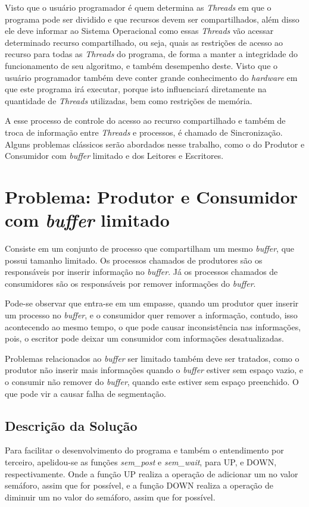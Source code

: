 \documentclass[a4paper, 11pt]{article}
\begin{document}
Visto que o usuário programador é quem determina as \textit{Threads} em que o programa pode ser dividido e que recursos devem ser compartilhados, além disso ele deve informar ao Sistema Operacional como essas \textit{Threads} vão acessar determinado recurso compartilhado, ou seja, quais as restrições de acesso ao recurso para todas as \textit{Threads} do programa, de forma a manter a integridade do funcionamento de seu algoritmo, e também desempenho deste. Visto que o usuário programador também deve conter grande conhecimento do \textit{hardware} em que este programa irá executar, porque isto influenciará diretamente na quantidade de \textit{Threads} utilizadas, bem como restrições de memória.

A esse processo de controle do acesso ao recurso compartilhado e também de troca de informação entre \textit{Threads} e processos, é chamado de Sincronização. Alguns problemas clássicos serão abordados nesse trabalho, como o do Produtor e Consumidor com \textit{buffer} limitado e dos Leitores e Escritores.

\section{Problema: Produtor e Consumidor com \textit{buffer} limitado}
Consiste em um conjunto de processo que compartilham um mesmo \textit{buffer}, que possui tamanho limitado. Os processos chamados de produtores são os responsáveis por inserir informação no \textit{buffer}. Já os processos chamados de consumidores são os responsáveis por remover informações do \textit{buffer}. 

Pode-se observar que entra-se em um empasse, quando um produtor quer inserir um processo no \textit{buffer}, e o consumidor quer remover a informação, contudo, isso acontecendo ao mesmo tempo, o que pode causar inconsistência nas informações, pois, o escritor pode deixar um consumidor com informações desatualizadas.

Problemas relacionados ao \textit{buffer} ser limitado também deve ser tratados, como o produtor não inserir mais informações quando o \textit{buffer} estiver sem espaço vazio, e o consumir não remover do \textit{buffer}, quando este estiver sem espaço preenchido. O que pode vir a causar falha de segmentação.

\subsection{Descrição da Solução}
Para facilitar o desenvolvimento do programa e também o entendimento por terceiro, apelidou-se as funções \textit{sem\_post} e \textit{sem\_wait}, para UP, e DOWN, respectivamente. Onde a função UP realiza a operação de adicionar um no valor semáforo, assim que for possível, e a função DOWN realiza a operação de diminuir um no valor do semáforo, assim que for possível.
\end{document}
